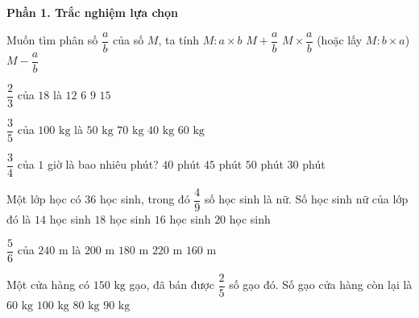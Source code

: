 \textbf{Phần 1. Trắc nghiệm lựa chọn}

\begin{ex} %
Muốn tìm phân số $\dfrac{a}{b}$ của số $M$, ta tính
\choice
{$M : a \times b$}
{$M + \dfrac{a}{b}$}
{\True $M \times \dfrac{a}{b}$ (hoặc lấy $M : b \times a$)}
{$M - \dfrac{a}{b}$}
\end{ex}

\begin{ex} %
$\dfrac{2}{3}$ của $18$ là
\choice
{\True $12$}
{$6$}
{$9$}
{$15$}
\end{ex}

\begin{ex} %
$\dfrac{3}{5}$ của $100\text{ kg}$ là
\choice
{$50\text{ kg}$}
{$70\text{ kg}$}
{$40\text{ kg}$}
{\True $60\text{ kg}$}
\end{ex}

\begin{ex} %
$\dfrac{3}{4}$ của $1$ giờ là bao nhiêu phút?
\choice
{$40$ phút}
{\True $45$ phút}
{$50$ phút}
{$30$ phút}
\end{ex}

\begin{ex} %
Một lớp học có 36 học sinh, trong đó $\dfrac{4}{9}$ số học sinh là nữ. Số học sinh nữ của lớp đó là
\choice
{$14$ học sinh}
{$18$ học sinh}
{\True $16$ học sinh}
{$20$ học sinh}
\end{ex}

\begin{ex} %
$\dfrac{5}{6}$ của $240\text{ m}$ là
\choice
{\True $200\text{ m}$}
{$180\text{ m}$}
{$220\text{ m}$}
{$160\text{ m}$}
\end{ex}

\begin{ex} %
Một cửa hàng có $150\text{ kg}$ gạo, đã bán được $\dfrac{2}{5}$ số gạo đó. Số gạo cửa hàng còn lại là
\choice
{$60\text{ kg}$}
{$100\text{ kg}$}
{$80\text{ kg}$}
{\True $90\text{ kg}$}
\end{ex}

